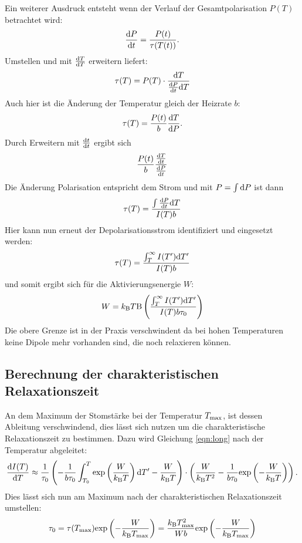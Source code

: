 				Ein weiterer Ausdruck entsteht wenn der Verlauf der Gesamtpolarisation $P(T)$ betrachtet wird:
				\begin{equation}
					\frac{\text{d} P}{\text{d} t} = \frac{P(t)}{\tau(T(t))}.
				\end{equation}
				Umstellen und mit $\frac{\text{d} T}{\text{d} T}$ erweitern liefert:
				\begin{equation}
					\tau(T) = P(T) \cdot \frac{\text{d}T}{\frac{\text{d} P}{\text{d} t}\text{d}T}
				\end{equation}
				Auch hier ist die Änderung der Temperatur gleich der Heizrate $b$:
				\begin{equation}
					\tau(T) = \frac{P(t)}{b}\frac{\text{d} T}{\text{d} P}.
				\end{equation}
				Durch Erweitern mit $\frac{\text{d} t}{\text{d} t}$ ergibt sich
				\begin{equation}
					\frac{P(t)}{b} \frac{\frac{\text{d} T}{\text{d} t}}{\frac{\text{d} P}{\text{d} t}}
				\end{equation}
				Die Änderung Polarisation entspricht dem Strom und mit $P = \int \text{d}P$ ist dann
				\begin{equation}
					\tau(T) = \frac{\int \frac{\text{d} P}{\text{d} t}\text{d}T}{I(T)b}
				\end{equation}
				Hier kann nun erneut der Depolarisationsstrom identifiziert und eingesetzt werden:
				\begin{equation}
					\tau(T) = \frac{\int_T^\infty I(T')\text{d}T'}{I(T)b}
				\end{equation}
				und somit ergibt sich für die Aktivierungsenergie $W$:
				\begin{equation}
					W = k_{\text{B}}T\text{B}\left( \frac{\int_T^\infty I(T')\text{d}T'}{I(T)b\tau_0}\right)
					\label{eqn:int}
				\end{equation}
				Die obere Grenze ist in der Praxis verschwindent da bei hohen Temperaturen keine Dipole mehr vorhanden sind, die noch relaxieren können.

	\subsection{Berechnung der charakteristischen Relaxationszeit}
				
		An dem Maximum der Stomstärke bei der Temperatur $T_{\text{max}}$, ist dessen Ableitung verschwindend, dies lässt sich nutzen um die charakteristische Relaxationszeit zu bestimmen.
		Dazu wird Gleichung \ref{eqn:long} nach der Temperatur abgeleitet:
		\begin{equation}
			\frac{\text{d} I(T)}{\text{d} T} \approx \frac{1}{\tau_0} \left( - \frac{1}{b\tau_0}
			\int_{T_0}^T \text{exp}\left(\frac{W}{k_{\text{B}}T}\right)\text{d}T' - 
			\frac{W}{k_{\text{B}}T}\right) \cdot \left( \frac{W}{k_{\text{B}}T^2} - 
			\frac{1}{b\tau_0} 
			\text{exp}\left(-\frac{W}{k_{\text{B}}T}\right)\right).
		\end{equation}
		Dies lässt sich nun am Maximum nach der charakteristischen Relaxationszeit umstellen:
		\begin{equation}
			\tau_0 = \tau(T_{\text{max}})\text{exp}\left(- \frac{W}{k_{\text{B}}T_{\text{max}}}\right) = \frac{k_{\text{B}}T^2_{\text{max}}}{Wb}\text{exp}\left(-\frac{W}{k_{\text{B}}T_{\text{max}}}\right)
		\end{equation}

	
